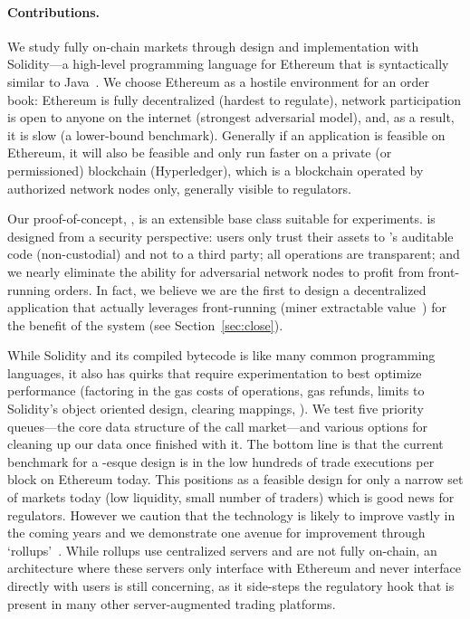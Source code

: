 \paragraph{Contributions.} We study fully on-chain markets through design and implementation with Solidity---a high-level programming language for Ethereum that is syntactically similar to Java~\cite{Ethereum41:online}. We choose Ethereum as a hostile environment for an order book: Ethereum is fully decentralized (hardest to regulate), network participation is open to anyone on the internet (strongest adversarial model), and, as a result, it is slow (a lower-bound benchmark). Generally if an application is feasible on Ethereum, it will also be feasible and only run faster on a private (or permissioned) blockchain (\eg Hyperledger), which is a blockchain operated by authorized network nodes only, generally visible to regulators. 

Our proof-of-concept, \cm, is an extensible base class suitable for experiments. \cm is designed from a security perspective: users only trust their assets to \cm's auditable code (non-custodial) and not to a third party; all operations are transparent; and we nearly eliminate the ability for adversarial network nodes to profit from front-running orders. In fact, we believe we are the first to design a decentralized application that actually leverages front-running (\ie miner extractable value~\cite{daian2019flash}) for the benefit of the system (see Section~\ref{sec:close}).  

While Solidity and its compiled bytecode is like many common programming languages, it also has quirks that require experimentation to best optimize performance (\eg factoring in the gas costs of operations, gas refunds, limits to Solidity's object oriented design, clearing mappings, \etc). We test five priority queues---the core data structure of the call market---and various options for cleaning up our data once finished with it. The bottom line is that the current benchmark for a \cm-esque design is in the low hundreds of trade executions per block on Ethereum today. This positions \cm as a feasible design for only a narrow set of markets today (low liquidity, small number of traders) which is good news for regulators. However we caution that the technology is likely to improve vastly in the coming years and we demonstrate one avenue for improvement through `rollups'~\cite{kalodner2018arbitrum}. While rollups use centralized servers and are not fully on-chain, an architecture where these servers only interface with Ethereum and never interface directly with users is still concerning, as it side-steps the regulatory hook that is present in many other server-augmented trading platforms.

